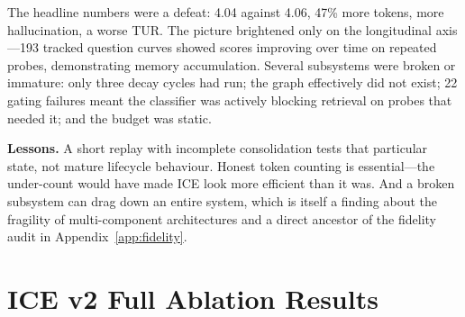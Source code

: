 \documentclass[11pt,a4paper]{article}
\begin{document}
The headline numbers were a defeat: 4.04 against 4.06, 47\% more tokens, more hallucination, a worse TUR. The picture brightened only on the longitudinal axis---193 tracked question curves showed scores improving over time on repeated probes, demonstrating memory accumulation. Several subsystems were broken or immature: only three decay cycles had run; the graph effectively did not exist; 22 gating failures meant the classifier was actively blocking retrieval on probes that needed it; and the budget was static.

\textbf{Lessons.} A short replay with incomplete consolidation tests that particular state, not mature lifecycle behaviour. Honest token counting is essential---the under-count would have made ICE look more efficient than it was. And a broken subsystem can drag down an entire system, which is itself a finding about the fragility of multi-component architectures and a direct ancestor of the fidelity audit in Appendix~\ref{app:fidelity}.

\FloatBarrier
\section{ICE v2 Full Ablation Results}
\label{app:ablation}
\end{document}
